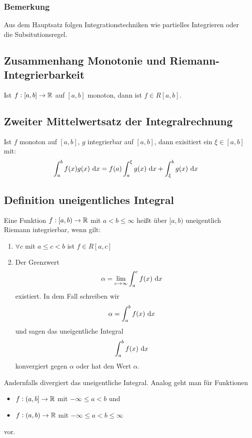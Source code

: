 \subsubsection{Bemerkung}
Aus dem Hauptsatz folgen Integrationstechniken wie partielles Integrieren oder
die Subsitutionsregel.

\subsection{Zusammenhang Monotonie und Riemann-Integrierbarkeit}
Ist $f: [a, b] \rightarrow \mathbb{R}$ auf $[a,b]$ monoton, dann ist $f \in R[a,b]$.

\subsection{Zweiter Mittelwertsatz der Integralrechnung}
Ist $f$ monoton auf $[a,b]$, $g$ integrierbar auf $[a,b]$, dann exisitiert ein
$\xi \in [a,b]$ mit:
\begin{equation*}
    \int_a^b f(x)g(x) \text{ d}x = f(a) \int_a^\xi g(x) \text{ d}x +
        \int_\xi^b g(x) \text{ d}x
\end{equation*}

\subsection{Definition uneigentliches Integral}
Eine Funktion $f: [a, b) \rightarrow \mathbb{R}$ mit $a < b \leq \infty$ heißt über
$[a,b)$ uneigentlich Riemann integrierbar, wenn gilt:
\begin{enumerate}[label= (\alph*)]
    \item $\forall c$ mit $a \leq c < b$ ist $f \in R[a, c]$
    \item Der Grenzwert
        \begin{equation*}
            \alpha = \lim_{c \rightarrow \infty} \int_a^c f(x) \text{ d}x
        \end{equation*}
        existiert. In dem Fall schreiben wir
        \begin{equation*}
            \alpha = \int_a^b f(x) \text{ d}x
        \end{equation*}
        und sagen das uneigentliche Integral
        \begin{equation*}
            \int_a^b f(x) \text{ d}x
        \end{equation*}
        konvergiert gegen $\alpha$ oder hat den Wert $\alpha$.
\end{enumerate}

Andernfalls divergiert das uneigentliche Integral.
Analog geht man für Funktionen
\begin{itemize}
    \item $f: (a, b] \rightarrow \mathbb{R}$ mit $-\infty \leq a < b$ und
    \item $f: (a, b) \rightarrow \mathbb{R}$ mit $-\infty \leq a < b \leq \infty$
\end{itemize}
vor.

